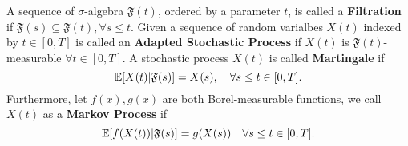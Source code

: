 \begin{definition}
A sequence of $\sigma$-algebra $\mathfrak{F}(t)$, ordered by a parameter $t$, is called a \textbf{Filtration} if $\mathfrak{F}(s)\subseteq\mathfrak{F}(t),\forall s\le t$. Given a sequence of random varialbes $X(t)$ indexed by $t\in[0,T]$ is called an \textbf{Adapted Stochastic Process} if $X(t)$ is $\mathfrak{F}(t)$-measurable $\forall t\in[0,T]$. A stochastic process $X(t)$ is called \textbf{Martingale} if 
\begin{equation}
\mathbb{E}[X(t)|\mathfrak{F}(s)]=X(s),\quad\forall s\le t\in[0,T].
\end{equation}
Furthermore, let $f(x),g(x)$ are both Borel-measurable functions, we call $X(t)$ as a \textbf{Markov Process} if 
\begin{equation}
\mathbb{E}[f(X(t))|\mathfrak{F}(s)]=g(X(s))\quad\forall s\le t\in[0,T].
\end{equation} 
\end{definition}